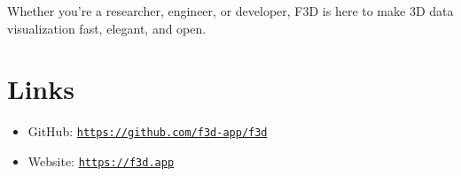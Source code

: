 \documentclass[10pt,journal,cspaper,compsoc]{journeevisu}
\begin{document}
Whether you're a researcher, engineer, or developer, F3D is here to make 3D data visualization fast, elegant, and open.

\section{Links}

\begin{itemize}
    \item GitHub: \href{https://github.com/f3d-app/f3d}{\texttt{https://github.com/f3d-app/f3d}}
    \item Website: \href{https://f3d.app}{\texttt{https://f3d.app}}
\end{itemize}





\end{document}
